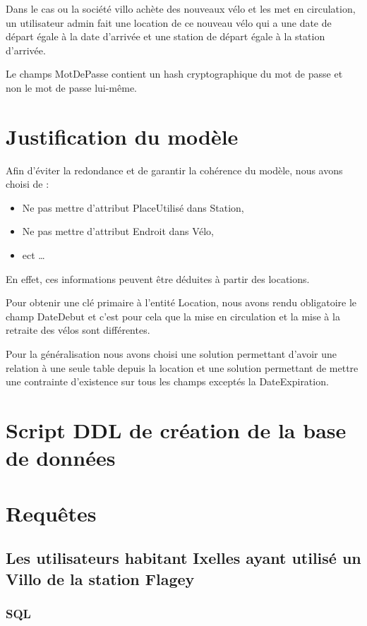 \documentclass[a4paper,10pt]{article}
\begin{document}
Dans le cas ou la société villo achète des nouveaux vélo et les met en circulation, un utilisateur admin fait une location de ce nouveau vélo qui a une date de départ égale à la date d'arrivée et une station de départ égale à la station d'arrivée.

Le champs MotDePasse contient un hash cryptographique du mot de passe et non le mot de passe lui-m\^eme.

\section{Justification du modèle}

Afin d'éviter la redondance et de garantir la cohérence du modèle, nous avons choisi de :
\begin{itemize}
  \item Ne pas mettre d'attribut PlaceUtilisé dans Station,
  \item Ne pas mettre d'attribut Endroit dans Vélo,
  \item ect \ldots
\end{itemize}
En effet, ces informations peuvent être déduites à partir des locations.

Pour obtenir une clé primaire à l'entité Location, nous avons rendu obligatoire le champ DateDebut et c'est pour cela que la mise en circulation et la mise à la retraite des vélos sont différentes.

Pour la généralisation nous avons choisi une solution permettant d'avoir une relation à une seule table depuis la location et une solution permettant de mettre une contrainte d'existence sur tous les champs exceptés la DateExpiration. 


\section{Script DDL de création de la base de données}


\pagebreak
\section{Requêtes}
\subsection{Les utilisateurs habitant Ixelles ayant utilisé un Villo de la station Flagey}
\subsubsection{SQL}

\end{document}
